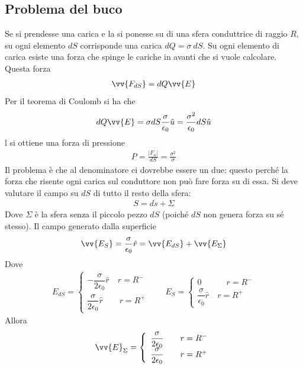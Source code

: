 \documentclass[a4paper, oneside]{article}
\begin{document}
\subsection{Problema del buco}
    Se si prendesse una carica e la si ponesse su di una sfera conduttrice di raggio $R$, 
    su ogni elemento $dS$ corrisponde una carica $dQ = \sigma \ dS$. Su ogni elemento di carica
    esiste una forza che spinge le cariche in avanti che si vuole calcolare. Questa forza 
    \begin{gather*}
        \vv{F_{dS}} = dQ \vv{E} 
    \end{gather*}
    Per il teorema di Coulomb si ha che
    \begin{gather*}
        dQ \vv{E} = \sigma dS \frac{\sigma}{\epsilon_0} \hat{u}  = \frac{\sigma^{2}}{\epsilon_0} dS \hat{u} 
    \end{gather*}
    l si ottiene una forza di pressione
    \begin{gather*}
        P = \frac{\left| F_u \right| }{dS} = \frac{\sigma^{2}}{\sigma}
    \end{gather*}
    Il problema è che al denominatore ci dovrebbe essere un due: questo perché la forza che risente
    ogni carica sul conduttore non può fare forza su di essa. Si deve valutare il campo su $dS$ di 
    tutto il resto della sfera:
    \begin{gather*}
        S = ds + \Sigma
    \end{gather*}
    Dove $\Sigma$ è la sfera senza il piccolo pezzo $dS$ (poiché $dS$ non genera forza su sé stesso). Il campo 
    generato dalla superficie
    \begin{gather*}
        \vv{E_S} = \frac{\sigma}{\epsilon_0}\hat{r} = \vv{E_{dS}} + \vv{E_\Sigma}   
    \end{gather*}
    Dove
    \begin{gather*}
        E_{dS} = \left\{\begin{array}{l}
            -\dfrac{\sigma}{2\epsilon_0} \hat{r} \quad r = R^{-} \\
            \dfrac{\sigma}{2\epsilon_0}\hat{r} \qquad r = R^{+}  
        \end{array}\right. \qquad E_S = \left\{\begin{array}{l}
            0 \qquad\quad r = R^{-} \\
            \dfrac{\sigma}{\epsilon_0 }\hat{r} \quad r = R^{+} 
        \end{array}\right.
    \end{gather*}
    Allora
    \begin{gather*}
        \vv{E}_\Sigma = \left\{\begin{array}{l}
            \dfrac{\sigma}{2\epsilon_0} \qquad r = R^{-} \\
            \dfrac{\sigma}{2\epsilon_0} \qquad r = R^{+}
        \end{array}\right. 
    \end{gather*}
\end{document}
